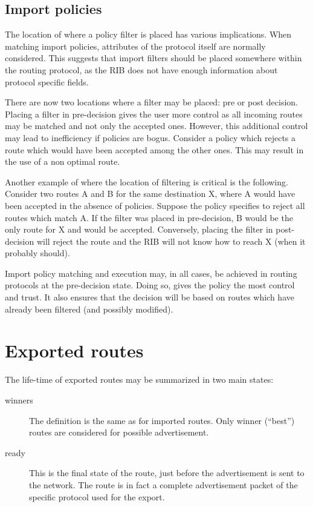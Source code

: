 \documentclass{article}
\begin{document}
\subsection{Import policies}
The location of where a policy filter is placed has various implications. When
matching import policies, attributes of the protocol itself are normally
considered. This suggests that import filters should be placed somewhere within
the routing protocol, as the RIB does not have enough information about protocol
specific fields.

There are now two locations where a filter may be placed: pre or post decision.
Placing a filter in pre-decision gives the user more control as all incoming
routes may be matched and not only the accepted ones. However, this additional
control may lead to inefficiency if policies are bogus. Consider a policy which
rejects a route which would have been accepted among the other ones.  This may
result in the use of a non optimal route.

Another example of where the location of filtering is critical is the following.
Consider two routes A and B for the same destination X, where A would have been
accepted in the absence of policies. Suppose the policy specifies to reject all
routes which match A. If the filter was placed in pre-decision, B would be the
only route for X and would be accepted. Conversely, placing the filter in
post-decision will reject the route and the RIB will not know how to reach X
(when it probably should).

Import policy matching and execution may, in all cases, be achieved in routing
protocols at the pre-decision state. Doing so, gives the policy the most control
and trust. It also ensures that the decision will be based on routes which have
already been filtered (and possibly modified).






\section{Exported routes}
The life-time of exported routes may be summarized in two main states:
\begin{description}
\item[winners] The definition is the same as for imported routes. Only winner
(``best'') routes are considered for possible advertisement.
\item[ready] This is the final state of the route, just before the advertisement
is sent to the network. The route is in fact a complete advertisement packet of
the specific protocol used for the export.
\end{description}
\end{document}
